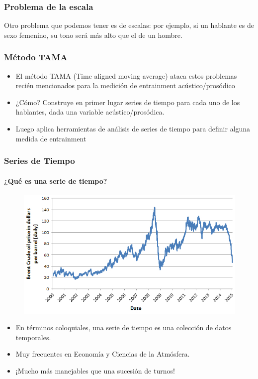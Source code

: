 \begin{frame}
  \frametitle{Problema de la escala}

  Otro problema que podemos tener es de escalas: por ejemplo, si un hablante es de sexo femenino, su tono será más alto que el de un hombre.

\end{frame}



\begin{frame}
  \frametitle{Método TAMA}
  \begin{itemize}
    \item El método TAMA (Time aligned moving average) ataca estos problemas recién mencionados para la medición de entrainment acústico/prosódico
    \item ¿Cómo? Construye en primer lugar series de tiempo para cada uno de los hablantes, dada una variable acústico/prosódica.
    \item Luego aplica herramientas de análisis de series de tiempo para definir alguna medida de entrainment
  \end{itemize}
\end{frame}


\begin{frame}
  \frametitle{Series de Tiempo}
  \framesubtitle{¿Qué es una serie de tiempo?}

  \begin{figure}[t]
    \includegraphics[scale=0.35]{images/oil_price.jpg}
  \end{figure}

  \begin{itemize}
     \item En términos coloquiales, una serie de tiempo es una colección de datos temporales.
     \item Muy frecuentes en Economía y Ciencias de la Atmósfera.
     \item ¡Mucho más manejables que una sucesión de turnos!
   \end{itemize}
\end{frame}



